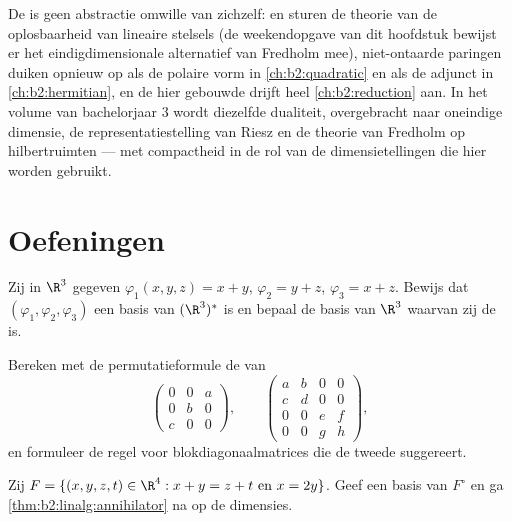 \begin{remark}
De  is geen abstractie omwille van zichzelf:
 en  sturen de theorie van de
oplosbaarheid van lineaire stelsels (de weekendopgave van dit
hoofdstuk bewijst er het eindigdimensionale alternatief van
Fredholm mee), niet-ontaarde paringen duiken opnieuw op als de
polaire vorm in \cref{ch:b2:quadratic} en als de adjunct in
\cref{ch:b2:hermitian}, en de hier gebouwde  drijft
heel \cref{ch:b2:reduction} aan. In het volume van bachelorjaar 3
wordt diezelfde dualiteit, overgebracht naar oneindige dimensie,
de representatiestelling van Riesz en de theorie van Fredholm op
hilbertruimten --- met compactheid in de rol van de
dimensietellingen die hier worden gebruikt.
\end{remark}

\section{Oefeningen}

\begin{exercise}[$\star$]\label{exo:b2:linalg:1}
Zij in $\R^3$ gegeven $\varphi_1(x,y,z) = x + y$, $\varphi_2 = y +
z$, $\varphi_3 = x + z$. Bewijs dat $(\varphi_1, \varphi_2,
\varphi_3)$ een basis van $(\R^3)^*$ is en bepaal de basis van
$\R^3$ waarvan zij de  is.
\end{exercise}

\begin{exercise}[$\star$]\label{exo:b2:linalg:2}
Bereken met de permutatieformule de  van
\[
\begin{pmatrix} 0 & 0 & a\\ 0 & b & 0\\ c & 0 & 0 \end{pmatrix},
\qquad
\begin{pmatrix}
a & b & 0 & 0\\
c & d & 0 & 0\\
0 & 0 & e & f\\
0 & 0 & g & h
\end{pmatrix},
\]
en formuleer de regel voor blokdiagonaalmatrices die de tweede
suggereert.
\end{exercise}

\begin{exercise}[$\star$]\label{exo:b2:linalg:3}
Zij $F = \{(x,y,z,t) \in \R^4 : x + y = z + t \text{ en } x =
2y\}$. Geef een basis van $F^\circ$ en ga
\cref{thm:b2:linalg:annihilator} na op de dimensies.
\end{exercise}

